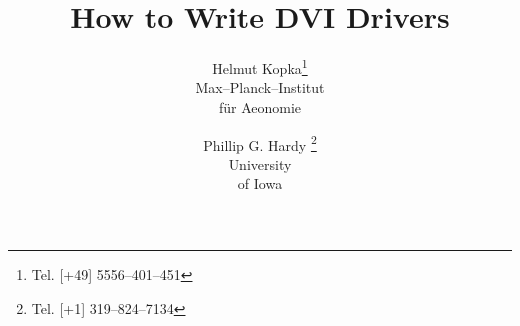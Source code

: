 \documentclass[12pt]{article}
\begin{document}
\title{%
  How to Write DVI Drivers}

\author{%
  Helmut Kopka\thanks{Tel. [+49] 5556--401--451}\\
  Max--Planck--Institut\\
  f\"ur Aeonomie
\and
  Phillip G. Hardy \thanks{Tel. [+1] 319--824--7134}\\
  University\\of Iowa
}
\maketitle
\end{document}
